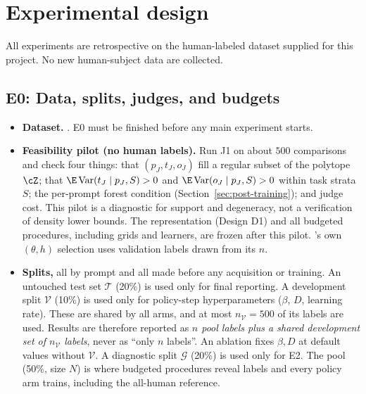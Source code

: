 \section{Experimental design}
\label{sec:experiments}

All experiments are retrospective on the human-labeled dataset supplied for this project. No new
human-subject data are collected.

\subsection{E0: Data, splits, judges, and budgets}

\begin{itemize}
  \item \textbf{Dataset.} . E0 must be finished before any main
        experiment starts.
  \item \textbf{Feasibility pilot (no human labels).} Run J1 on about $500$ comparisons and check four
        things: that $(p_J,t_J,o_J)$ fill a regular subset of the polytope $\cZ$; that
        $\E\,\mathrm{Var}(t_J\mid p_J,S)>0$ and $\E\,\mathrm{Var}(o_J\mid p_J,S)>0$ within task
        strata $S$; the per-prompt forest condition (Section~\ref{sec:post-training}); and judge
        cost. This pilot is a diagnostic for support and degeneracy, not a verification of density
        lower bounds. The representation (Design D1) and all budgeted procedures, including
        \dfsp{} grids and learners, are frozen after this pilot. \dfsp{}'s own $(\theta,h)$
        selection uses validation labels drawn from its $n$.
  \item \textbf{Splits,} all by prompt and all made before any acquisition or training. An untouched
        test set $\mathcal T$ (20\%) is used only for final reporting. A development split
        $\mathcal V$ (10\%) is used only for policy-step hyperparameters ($\beta$, $D$, learning
        rate). These are shared by all arms, and at most $n_{\mathcal V}=500$ of its labels are used.
        Results are therefore reported as \emph{$n$ pool labels plus a shared development set of
        $n_{\mathcal V}$ labels}, never as ``only $n$ labels''. An ablation fixes $\beta,D$ at
        default values without $\mathcal V$. A diagnostic split
        $\mathcal G$ (20\%) is used only for E2. The pool (50\%, size $N$) is where budgeted
        procedures reveal labels and every policy arm trains, including the all-human reference.

\end{itemize}
